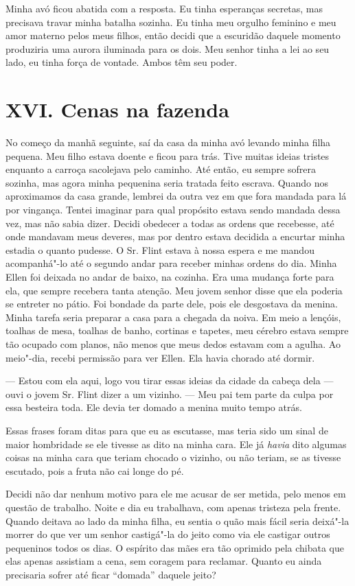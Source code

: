 Minha avó ficou abatida com a resposta.
Eu tinha esperanças secretas, mas precisava travar minha batalha
sozinha. Eu tinha meu orgulho feminino e meu amor materno pelos meus
filhos, então decidi que a escuridão daquele momento produziria uma
aurora iluminada para os dois. Meu senhor tinha a lei ao seu lado, eu
tinha força de vontade. Ambos têm seu poder.

\chapter{XVI. Cenas na fazenda}

No começo da manhã seguinte, saí da
casa da minha avó levando minha filha pequena. Meu filho estava doente e
ficou para trás. Tive muitas ideias tristes enquanto a carroça
sacolejava pelo caminho. Até então, eu sempre sofrera sozinha, mas agora
minha pequenina seria tratada feito escrava. Quando nos aproximamos da
casa grande, lembrei da outra vez em que fora mandada para lá por
vingança. Tentei imaginar para qual propósito estava sendo mandada dessa
vez, mas não sabia dizer. Decidi obedecer a todas as ordens que
recebesse, até onde mandavam meus deveres, mas por dentro estava
decidida a encurtar minha estadia o quanto pudesse. O Sr. Flint estava à
nossa espera e me mandou acompanhá"-lo até o segundo andar para receber
minhas ordens do dia. Minha Ellen foi deixada no andar de baixo, na
cozinha. Era uma mudança forte para ela, que sempre recebera tanta
atenção. Meu jovem senhor disse que ela poderia se entreter no pátio.
Foi bondade da parte dele, pois ele desgostava da menina. Minha tarefa
seria preparar a casa para a chegada da noiva. Em meio a lençóis,
toalhas de mesa, toalhas de banho, cortinas e tapetes, meu cérebro
estava sempre tão ocupado com planos, não menos que meus dedos estavam
com a agulha. Ao meio"-dia, recebi permissão para ver Ellen. Ela havia
chorado até dormir.

--- Estou com ela aqui, logo vou tirar essas ideias da cidade da cabeça
dela --- ouvi o jovem Sr. Flint dizer a um vizinho. --- Meu pai tem
parte da culpa por essa besteira toda. Ele devia ter domado a menina
muito tempo atrás.

Essas frases foram ditas para que eu as escutasse, mas teria sido um
sinal de maior hombridade se ele tivesse as dito na minha cara. Ele já
\emph{havia} dito algumas coisas na minha cara que teriam chocado o
vizinho, ou não teriam, se as tivesse escutado, pois a fruta não cai
longe do pé.

Decidi não dar nenhum motivo para ele
me acusar de ser metida, pelo menos em questão de trabalho. Noite e dia
eu trabalhava, com apenas tristeza pela frente. Quando deitava ao lado
da minha filha, eu sentia o quão mais fácil seria deixá"-la morrer do que
ver um senhor castigá"-la do jeito como via ele castigar outros
pequeninos todos os dias. O espírito das mães era tão oprimido pela
chibata que elas apenas assistiam a cena, sem coragem para reclamar.
Quanto eu ainda precisaria sofrer até ficar ``domada'' daquele jeito?


